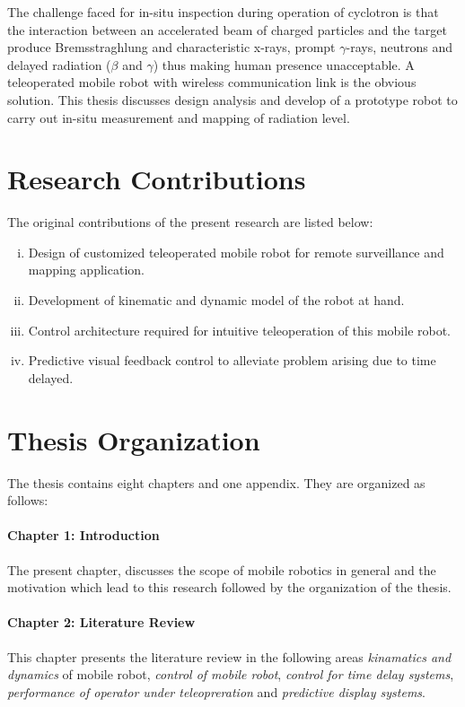 The challenge faced for in-situ inspection during operation of cyclotron is that the interaction  between  an  accelerated  beam   of  charged  particles  and  the  target  produce Bremsstraghlung and characteristic x-rays, prompt $\gamma$-rays, neutrons and delayed radiation ($\beta $ and $\gamma$) thus making human presence unacceptable.  A teleoperated mobile robot with wireless communication link is the obvious solution. This thesis discusses design analysis and develop of a prototype robot  to carry out in-situ measurement and mapping of radiation level.

\section{Research Contributions}
The original contributions of the present research are listed below:
\begin{enumerate}[(i)]

\item Design of customized teleoperated mobile robot for remote surveillance and mapping application.
\item Development of kinematic and dynamic model of the robot at hand.
\item Control architecture required for intuitive teleoperation of this mobile robot.
\item Predictive visual feedback control to alleviate problem arising due to time delayed.


\end{enumerate}
\section{Thesis Organization}
The thesis contains eight chapters and one appendix. They are organized as follows:
\paragraph*{Chapter 1: Introduction\\}
The present chapter, discusses the scope of mobile robotics in general and the motivation which lead to this research followed by the organization of the thesis.
\paragraph*{Chapter 2: Literature Review\\}
This chapter presents the literature review in the following areas \textit{kinamatics and dynamics} of mobile robot, \textit{control of mobile robot}, \textit{control for time delay systems}, \textit{performance of operator under teleopreration}  and \textit{predictive display systems}.

